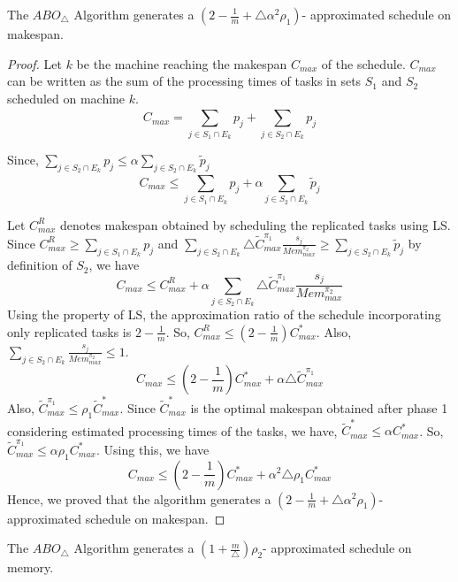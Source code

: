 \documentclass[twocolumn]{svjour3}
\begin{document}
\begin{theorem}
  \label{th:chapter5-la}
  The $ABO_\triangle$ Algorithm generates a $
  (2-\frac{1}{m}+\triangle\alpha^2 \rho_1) $- approximated schedule on
  makespan.
\end{theorem}         
\begin{proof}
  Let $k$ be the machine reaching the makespan $C_{max}$ of the
  schedule. $C_{max}$ can be written as the sum of the processing
  times of tasks in sets $S_1$ and $S_2$ scheduled on machine $k$.
  \begin{equation}\nonumber
    C_{max}= \sum_{j \in S_1 \cap E_k}^{}p_j+\sum_{j \in S_2 \cap E_k}^{}p_j 
  \end{equation}
  
  Since, $\sum\limits_{j \in S_2 \cap
    E_k}^{}p_j\leq\alpha \sum \limits_{j \in S_2 \cap E_k} \tilde{p}_j$
  \begin{equation}\nonumber
    C_{max} \leq \sum_{j \in S_1 \cap E_k}^{}p_j+\alpha\sum_{j \in S_2 \cap E_k} \tilde{p}_j 
  \end{equation}
          
           
  Let $C^R_{max}$ denotes makespan obtained by scheduling the
  replicated tasks using LS. Since $C^R_{max} \geq \sum\limits_{j \in
    S_1 \cap E_k}^{}p_j$ and $\sum\limits_{j \in S_2\cap E_k}\triangle
  {\tilde{C}^{\pi_1}_{max}} \frac{s_j}{Mem^{\pi_2}_{max}}\geq
  \sum\limits _{j \in S_2\cap E_k}^{}\tilde{p}_j $ by definition of
  $S_2$, we have
  \begin{equation}\nonumber
    C_{max}\leq C^R_{max}+\alpha\sum_{j \in S_2\cap E_k}^{}\triangle {\tilde{C}^{\pi_1}_{max}} \frac{s_j}{Mem^{\pi_2}_{max}}
  \end{equation}
  Using the property of LS, the approximation ratio of the schedule
  incorporating only replicated tasks is $2-\frac{1}{m}$. So,
  $C^R_{max} \leq (2-\frac{1}{m})C^{*}_{max}$. Also, $\sum\limits
  _{j\in S_2\cap E_k}^{} \frac{s_j}{Mem^{\pi_2}_{max}}\leq 1$.
  \begin{equation}\nonumber
    C_{max}\leq (2-\frac{1}{m})C^{*}_{max}+\alpha\triangle {\tilde{C}^{\pi_1}_{max}} 
  \end{equation}
  Also, ${\tilde{C}^{\pi_1}_{max}} \leq \rho_1
  {\tilde{C}^{*}_{max}}$. Since $\tilde{C}^{*}_{max}$ is the optimal
  makespan obtained after phase 1 considering estimated processing
  times of the tasks, we have, $\tilde{C}^{*}_{max}\leq
  \alpha{C}^{*}_{max}$. So, ${\tilde{C}^{\pi_1}_{max}} \leq \alpha
  \rho_1{C}^{*}_{max}$. Using this, we have
  \begin{equation}\nonumber
    C_{max}\leq (2-\frac{1}{m}){{C}^{*}_{max}}+\alpha^2\triangle \rho_1 {{C}^{*}_{max}} 
  \end{equation}
  Hence, we proved that the algorithm generates a
  $(2-\frac{1}{m}+\triangle \alpha^2\rho_1) $- approximated schedule
  on makespan.
\end{proof}
\begin{theorem}
  \label{th:chapter5-lb}
  The $ABO_\triangle$ Algorithm generates a $
  (1+\frac{m}{\triangle})\rho_2 $- approximated schedule on memory.
\end{theorem}
        
\end{document}

